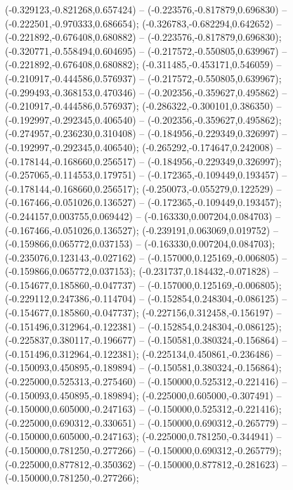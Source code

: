  (-0.329123,-0.821268,0.657424) -- (-0.223576,-0.817879,0.696830) -- (-0.222501,-0.970333,0.686654);
 (-0.326783,-0.682294,0.642652) -- (-0.221892,-0.676408,0.680882) -- (-0.223576,-0.817879,0.696830);
 (-0.320771,-0.558494,0.604695) -- (-0.217572,-0.550805,0.639967) -- (-0.221892,-0.676408,0.680882);
 (-0.311485,-0.453171,0.546059) -- (-0.210917,-0.444586,0.576937) -- (-0.217572,-0.550805,0.639967);
 (-0.299493,-0.368153,0.470346) -- (-0.202356,-0.359627,0.495862) -- (-0.210917,-0.444586,0.576937);
 (-0.286322,-0.300101,0.386350) -- (-0.192997,-0.292345,0.406540) -- (-0.202356,-0.359627,0.495862);
 (-0.274957,-0.236230,0.310408) -- (-0.184956,-0.229349,0.326997) -- (-0.192997,-0.292345,0.406540);
 (-0.265292,-0.174647,0.242008) -- (-0.178144,-0.168660,0.256517) -- (-0.184956,-0.229349,0.326997);
 (-0.257065,-0.114553,0.179751) -- (-0.172365,-0.109449,0.193457) -- (-0.178144,-0.168660,0.256517);
 (-0.250073,-0.055279,0.122529) -- (-0.167466,-0.051026,0.136527) -- (-0.172365,-0.109449,0.193457);
 (-0.244157,0.003755,0.069442) -- (-0.163330,0.007204,0.084703) -- (-0.167466,-0.051026,0.136527);
 (-0.239191,0.063069,0.019752) -- (-0.159866,0.065772,0.037153) -- (-0.163330,0.007204,0.084703);
 (-0.235076,0.123143,-0.027162) -- (-0.157000,0.125169,-0.006805) -- (-0.159866,0.065772,0.037153);
 (-0.231737,0.184432,-0.071828) -- (-0.154677,0.185860,-0.047737) -- (-0.157000,0.125169,-0.006805);
 (-0.229112,0.247386,-0.114704) -- (-0.152854,0.248304,-0.086125) -- (-0.154677,0.185860,-0.047737);
 (-0.227156,0.312458,-0.156197) -- (-0.151496,0.312964,-0.122381) -- (-0.152854,0.248304,-0.086125);
 (-0.225837,0.380117,-0.196677) -- (-0.150581,0.380324,-0.156864) -- (-0.151496,0.312964,-0.122381);
 (-0.225134,0.450861,-0.236486) -- (-0.150093,0.450895,-0.189894) -- (-0.150581,0.380324,-0.156864);
 (-0.225000,0.525313,-0.275460) -- (-0.150000,0.525312,-0.221416) -- (-0.150093,0.450895,-0.189894);
 (-0.225000,0.605000,-0.307491) -- (-0.150000,0.605000,-0.247163) -- (-0.150000,0.525312,-0.221416);
 (-0.225000,0.690312,-0.330651) -- (-0.150000,0.690312,-0.265779) -- (-0.150000,0.605000,-0.247163);
 (-0.225000,0.781250,-0.344941) -- (-0.150000,0.781250,-0.277266) -- (-0.150000,0.690312,-0.265779);
 (-0.225000,0.877812,-0.350362) -- (-0.150000,0.877812,-0.281623) -- (-0.150000,0.781250,-0.277266);
